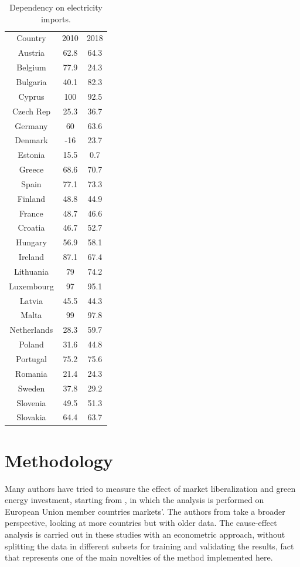 \documentclass{book}
\begin{document}
\bigskip
\begin{table}[H]
\begin{center}
\begin{tabular}{|c|c|c|}
\hline
\rowcolor{lightgray} \multicolumn{3}{|c|}{Electricity Dependence (\%) }\\
\hline
Country & 2010 & 2018 \\
\hline
Austria & 62.8 & 64.3 \\
Belgium & 77.9 & 24.3 \\
Bulgaria & 40.1 & 82.3 \\
Cyprus & 100 & 92.5 \\
Czech Rep & 25.3 & 36.7\\
Germany & 60 & 63.6 \\
Denmark & -16 & 23.7 \\
Estonia & 15.5 & 0.7 \\
Greece & 68.6 & 70.7 \\
Spain & 77.1 &  73.3 \\
Finland & 48.8 & 44.9 \\
France & 48.7 & 46.6 \\
Croatia & 46.7 & 52.7 \\
Hungary &  56.9 & 58.1 \\
Ireland & 87.1 & 67.4 \\
Lithuania & 79 & 74.2 \\
Luxembourg & 97 & 95.1 \\
Latvia & 45.5 & 44.3 \\
Malta & 99 & 97.8 \\
Netherlands & 28.3 & 59.7 \\
Poland & 31.6 & 44.8 \\
Portugal & 75.2 & 75.6 \\
Romania & 21.4 & 24.3 \\
Sweden & 37.8 & 29.2 \\
Slovenia & 49.5 & 51.3 \\
Slovakia & 64.4 & 63.7 \\
\hline
\end{tabular}
\end{center}
\caption{Dependency on electricity imports. }
\end{table}
\bigskip

\chapter{Methodology}

Many authors have tried to measure the effect of market liberalization and green energy investment, starting from \cite{moreno2012electricity}, in which the analysis  is performed on European Union member countries markets'. The authors from \cite{nagayama2009electric} take a broader perspective, looking at more countries but with older data. The cause-effect analysis is carried out in these studies with an econometric approach, without splitting the data in different subsets for training and validating the results, fact that represents one of the main novelties of the method implemented here.\\
\end{document}
